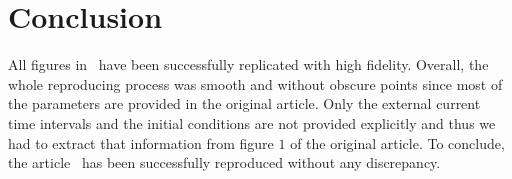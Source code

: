 \documentclass[10pt,a4paper,onecolumn]{article}
\begin{document}
\section{Conclusion}\label{conclusion}

All figures in~\textcite{mihalas:2009} have been successfully replicated 
with high fidelity. Overall, the whole reproducing process was smooth and
without obscure points since most of the parameters are provided in the
original article. Only the external current time intervals and the initial
conditions are not provided explicitly and thus we had to extract that
information from figure $1$ of the original article. To conclude, the
article~\cite{mihalas:2009} has been successfully reproduced without any
discrepancy. 

{\sffamily \small
  \printbibliography[title=References]
}
\end{document}
